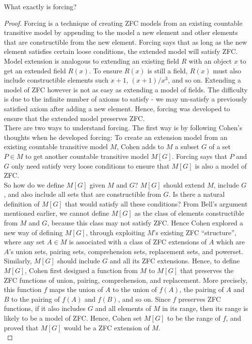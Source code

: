 \begin{question}
  What exactly is forcing?
\end{question}
\begin{proof}
  Forcing is a technique of creating ZFC models from an existing countable
  transitive model by appending to the model a new element and other elements
  that are constructible from the new element. Forcing says that as long as
  the new element satisfies certain loose conditions, the extended model will
  satisfy ZFC.\\

  Model extension is analogous to extending an existing field $R$ with an
  object $x$ to get an extended field $R(x)$. To ensure $R(x)$ is still a
  field, $R(x)$ must also include constructible elements such $x+1$,
  $(x+1)/x^3$, and so on. Extending a model of ZFC however is not as easy
  as extending a model of fields. The difficulty is due to the infinite
  number of axioms to satisfy - we may un-satisfy a previously satisfied
  axiom after adding a new element. Hence, forcing was developed to ensure
  that the extended model preserves ZFC.\\

  There are two ways to understand forcing. The first way is by following
  Cohen's thoughts when he developed forcing: To create an extension model
  from an existing countable transitive model $M$, Cohen adds to $M$ a
  subset $G$ of a set $P\in M$ to get another countable transitive model
  $M[G]$. Forcing says that $P$ and $G$ only need satisfy very loose
  conditions to ensure that $M[G]$ is also a model of ZFC. \\

  So how do we define $M[G]$ given $M$ and $G$?
  $M[G]$ should extend $M$, include $G$, and also include all sets that are
  constructible from $G$. Is there a natural definition of $M[G]$ that
  would satisfy all these conditions? From Bell's argument mentioned
  earlier, we cannot define $M[G]$ as the class of elements constructible
  from $M$ and $G$, because this class may not satisfy ZFC. Hence Cohen
  explored a new way of defining $M[G]$, through exploiting $M$'s existing
  ZFC ``structure'', where any set $A\in M$ is associated with a class of
  ZFC extensions of $A$ which are $A$'s union sets, pairing sets,
  comprehension sets, replacement sets, and powerset. Similarly, $M[G]$
  should include $G$ and all its ZFC extensions. Hence, to define $M[G]$,
  Cohen first designed a function from $M$ to $M[G]$ that preserves the ZFC
  functions of union, pairing, comprehension, and replacement. More
  precisely, this function $f$ maps the union of $A$ to the union of
  $f(A)$, the pairing of $A$ and $B$ to the pairing of $f(A)$ and $f(B)$,
  and so on. Since $f$ preserves ZFC functions, if it also includes $G$ and
  all elements of $M$ in its range, then its range is likely to be a model
  of ZFC.  Hence, Cohen set $M[G]$ to be the range of $f$, and proved that
  $M[G]$ would be a ZFC extension of $M$.\\


\end{proof}
